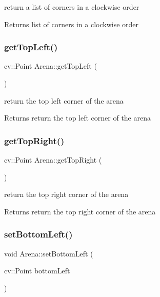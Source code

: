 return a list of corners in a clockwise order \begin{DoxyReturn}{Returns}
list of corners in a clockwise order 
\end{DoxyReturn}
\mbox{\label{class_arena_ae7219e6d298213627a0c671e5c5f9536}} 
\subsubsection{\texorpdfstring{get\+Top\+Left()}{getTopLeft()}}
{\footnotesize\ttfamily cv\+::\+Point Arena\+::get\+Top\+Left (\begin{DoxyParamCaption}{ }\end{DoxyParamCaption})}

return the top left corner of the arena \begin{DoxyReturn}{Returns}
return the top left corner of the arena 
\end{DoxyReturn}
\mbox{\label{class_arena_aa417bc8757d66038038ac3f6a9d44860}} 
\subsubsection{\texorpdfstring{get\+Top\+Right()}{getTopRight()}}
{\footnotesize\ttfamily cv\+::\+Point Arena\+::get\+Top\+Right (\begin{DoxyParamCaption}{ }\end{DoxyParamCaption})}

return the top right corner of the arena \begin{DoxyReturn}{Returns}
return the top right corner of the arena 
\end{DoxyReturn}
\mbox{\label{class_arena_ac546db1983967fcc195369c8a0f1f9e5}} 
\subsubsection{\texorpdfstring{set\+Bottom\+Left()}{setBottomLeft()}}
{\footnotesize\ttfamily void Arena\+::set\+Bottom\+Left (\begin{DoxyParamCaption}\item[{cv\+::\+Point}]{bottom\+Left }\end{DoxyParamCaption})}

